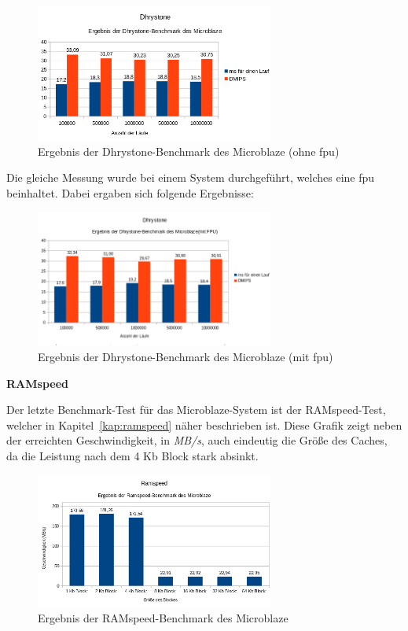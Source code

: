 \begin{figure}[H]
\centering
\includegraphics[width=0.7\textwidth]{Hauptteil/dhrystonembohnefpu.png}
\caption{Ergebnis der Dhrystone-Benchmark des Microblaze (ohne \ac{fpu})}
\label{fig:dhrystonembohnefpu}
\end{figure}

Die gleiche Messung wurde bei einem System durchgeführt, welches eine \ac{fpu} beinhaltet. Dabei ergaben sich folgende Ergebnisse:\\

\begin{figure}[H]
\centering
\includegraphics[width=0.7\textwidth]{Hauptteil/dhrystonembmitfpu.png}
\caption{Ergebnis der Dhrystone-Benchmark des Microblaze (mit \ac{fpu})}
\label{fig:dhrystonembmitfpu}
\end{figure}

\textbf{RAMspeed}

Der letzte Benchmark-Test für das Microblaze-System ist der RAMspeed-Test, welcher in Kapitel~\ref{kap:ramspeed} näher beschrieben ist. Diese Grafik zeigt neben der
erreichten Geschwindigkeit, in \emph{MB/s}, auch eindeutig die Größe des Caches, da die Leistung nach dem 4 Kb Block stark absinkt.\\


\begin{figure}[H]
\centering
\includegraphics[width=0.7\textwidth]{Hauptteil/ramspeedmicroblaze.png}
\caption{Ergebnis der RAMspeed-Benchmark des Microblaze}
\label{fig:ramspeedmicroblaze}
\end{figure}



